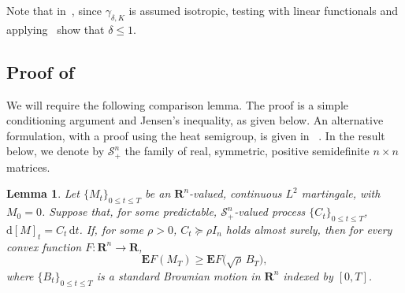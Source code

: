 \documentclass[11pt]{amsart}
\newcommand{\R}{\mathbf R}
\newcommand{\E}{\mathbf E}
\newcommand{\cS}{\mathcal{S}}
\newcommand{\1}{\mathbf 1}
\newcommand{\ud}{\mathrm{d}}
\theoremstyle{plain}
\newtheorem{lemma}[theorem]{Lemma}
\begin{document}
Note that in~, since $\gamma_{\delta, K}$ is assumed isotropic, testing with linear functionals and applying~ show that $\delta \leq 1$.


\subsection{Proof of~\texorpdfstring{}{the comparison from eigenvalue control}}

\label{app:proofs-of-stoch-loc-lemmas}


We will require the following comparison lemma. The proof is a simple conditioning argument and Jensen's inequality, as given below. An alternative formulation, with a proof using the heat semigroup, is given in 
~\cite[Proposition 3.2]{BizKla26}. In the result below, we denote by $\cS^n_+$ the family of real, symmetric, positive semidefinite $n \times n$ matrices.

\begin{lemma}
\label{lem:comparison-result}
Let $\{M_t\}_{0\leq t\leq T}$ be an $\R^n$-valued, continuous $L^2$ martingale, with $M_0=0$. 
Suppose that, for some predictable, $\cS^n_+$-valued process $\{C_t\}_{0 \leq t \leq T}$, $\ud [M]_t = C_t \, \ud t$. If, for some $\rho>0$,
$C_t \succeq \rho I_n$ holds almost surely, then 
for every convex function $F \colon \R^n\to\R$,
\[
\E F(M_T)\geq \E F\bigl(\sqrt{\rho}\,B_T\bigr),
\]
where $\{B_t\}_{0 \leq t\leq T}$ is a standard Brownian motion in $\R^n$ indexed by $[0, T]$.
\end{lemma}
\end{document}
